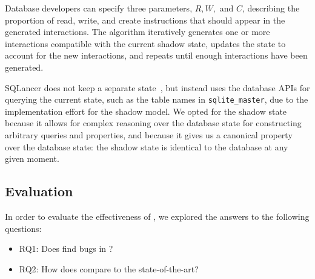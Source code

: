 Database developers can specify three parameters, $R, W,$ and $C$, describing the
proportion of read, write, and create instructions that should appear in the generated
interactions. The algorithm iteratively generates one or more interactions compatible
with the current shadow state, updates the state to account for the new interactions,
and repeats until enough interactions have been generated.

SQLancer does not keep a separate state~\cite{rigger.pqs}, but instead uses the
database APIs for querying the current state, such as the table names in
\texttt{sqlite\_master}, due to the implementation effort for the shadow model. We
opted for the shadow state because it allows for complex reasoning over the database
state for constructing arbitrary queries and properties, and because it gives us a
canonical property over the database state: the shadow state is identical to the
database at any given moment.

\subsection{Evaluation}\label{dirt:sec:eval}

In order to evaluate the effectiveness of \tool{}, we explored the answers to the
following questions:

\begin{itemize}
  \item RQ1: Does \tool{} find bugs in \db{}?
  \item RQ2: How does \tool{} compare to the state-of-the-art?
\end{itemize}

